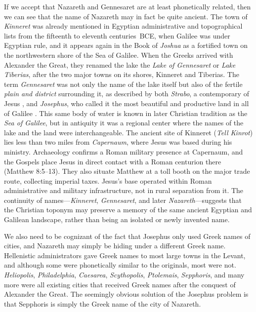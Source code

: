 If we accept that Nazareth and Gennesaret are at least phonetically related, then we can see that the name of Nazareth may in fact be quite ancient.
The town of \textit{Kinneret} was already mentioned in Egyptian administrative and topographical lists from the fifteenth to eleventh centuries~BCE, when Galilee was under Egyptian rule, and it appears again in the Book of \textit{Joshua} as a fortified town on the northwestern shore of the Sea of Galilee.
When the Greeks arrived with Alexander the Great, they renamed the lake the \textit{Lake of Gennesaret} or \textit{Lake Tiberias}, after the two major towns on its shores, Kinneret and Tiberias.
The term \textit{Gennesaret} was not only the name of the lake itself but also of the fertile \textit{plain and district} surrounding it, as described by both \textit{Strabo}, a contemporary of Jesus \cite[16.2.16]{strabo:geography}, and \textit{Josephus}, who called it the most beautiful and productive land in all of Galilee \cite[3.516--521]{josephus:war}.
This same body of water is known in later Christian tradition as the \textit{Sea of Galilee}, but in antiquity it was a regional center where the names of the lake and the land were interchangeable.
The ancient site of Kinneret (\textit{Tell Kinrot}) lies less than two miles from \textit{Capernaum}, where Jesus was based during his ministry.
Archaeology confirms a Roman military presence at Capernaum, and the Gospels place Jesus in direct contact with a Roman centurion there (Matthew 8:5--13).
They also situate Matthew at a toll booth on the major trade route, collecting imperial taxes.
Jesus's base operated within Roman administrative and military infrastructure, not in rural separation from it.
The continuity of names---\textit{Kinneret}, \textit{Gennesaret}, and later \textit{Nazareth}---suggests that the Christian toponym may preserve a memory of the same ancient Egyptian and Galilean landscape, rather than being an isolated or newly invented name.

We also need to be cognizant of the fact that Josephus only used Greek names of cities, and Nazareth may simply be hiding under a different Greek name.
Hellenistic administrators gave Greek names to most large towns in the Levant, and although some were phonetically similar to the originals, most were not.
\textit{Heliopolis}, \textit{Philadelphia}, \textit{Caesarea}, \textit{Scythopolis}, \textit{Ptolemais}, \textit{Sepphoris}, and many more were all existing cities that received Greek names after the conquest of Alexander the Great.
The seemingly obvious solution of the Josephus problem is that Sepphoris is simply the Greek name of the city of Nazareth.

